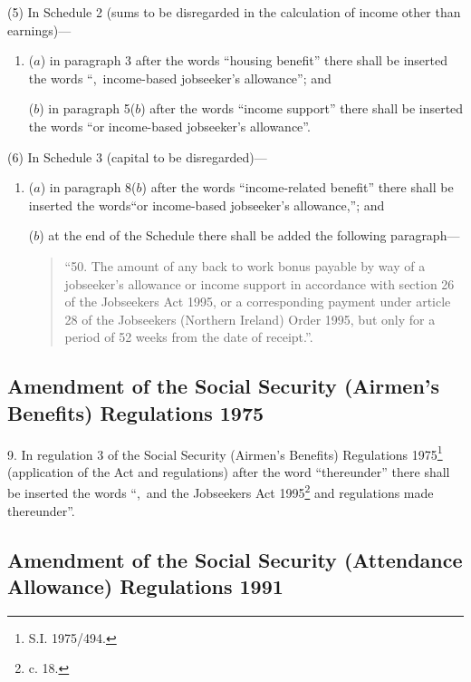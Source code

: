 \documentclass[a4paper]{article}
\begin{document}
(5) In Schedule 2 (sums to be disregarded in the calculation of income other than earnings)—
\begin{enumerate}\item[]
($a$) in paragraph 3 after the words “housing benefit” there shall be inserted the words “,~income-based jobseeker’s allowance”; and

($b$) in paragraph 5($b$) after the words “income support” there shall be inserted the words “or income-based jobseeker’s allowance”.
\end{enumerate}

(6) In Schedule 3 (capital to be disregarded)—
\begin{enumerate}\item[]
($a$) in paragraph 8($b$) after the words “income-related benefit” there shall be inserted the words“or income-based jobseeker’s allowance,”; and

($b$) at the end of the Schedule there shall be added the following paragraph—
\begin{quotation}
“50.  The amount of any back to work bonus payable by way of a jobseeker’s allowance or income support in accordance with section 26 of the Jobseekers Act 1995, or a corresponding payment under article 28 of the Jobseekers (Northern Ireland) Order 1995, but only for a period of 52 weeks from the date of receipt.”.
\end{quotation}
\end{enumerate}

\subsection[9. Amendment of the Social Security (Airmen’s Benefits) Regulations 1975]{Amendment of the Social Security (Airmen’s Benefits) Regulations 1975}

9.  In regulation 3 of the Social Security (Airmen’s Benefits) Regulations 1975\footnote{\frenchspacing S.I. 1975/494.} (application of the Act and regulations) after the word “thereunder” there shall be inserted the words “,~and the Jobseekers Act 1995\footnote{ c. 18.} and regulations made thereunder”.

\subsection[10. Amendment of the Social Security (Attendance Allowance) Regulations 1991]{\sloppy Amendment of the Social Security (Attendance Allowance) Regulations 1991}
\end{document}
